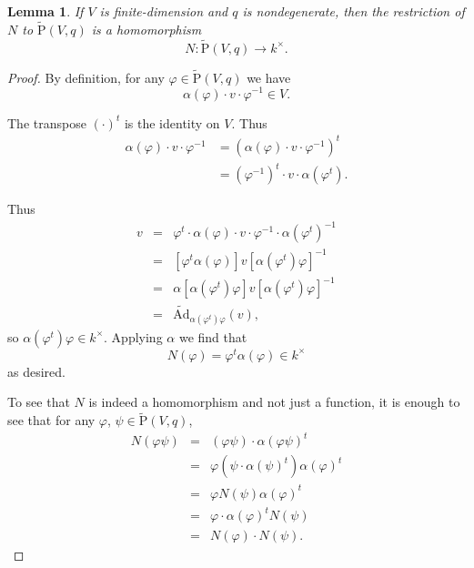 \documentclass[a4paper,10pt]{scrreprt}
\newcommand{\tAd}{\widetilde{\mathrm{Ad}}}
\newcommand{\tP}{\tilde{\mathrm{P}}}
\theoremstyle{definition}
\theoremstyle{plain}
\newtheorem{lemma}{Lemma}[section]
\theoremstyle{remark}
\begin{document}
\begin{lemma}
  If $V$ is finite-dimension and $q$ is nondegenerate, then the restriction of $N$ to $\tP(V, q)$ is a homomorphism 
  \begin{equation*}
    N\colon \tP(V, q) \to k^{\times}.
  \end{equation*}
\end{lemma}
\begin{proof}
  By definition, for any $\varphi \in \tP(V, q)$ we have 
  \begin{equation*}
    \alpha(\varphi) \cdot v \cdot \varphi^{-1} \in V.
  \end{equation*}

  The transpose $( \cdot )^{t}$ is the identity on $V$. Thus
  \begin{align*}
    \alpha(\varphi) \cdot v \cdot \varphi^{-1} &=  (\alpha(\varphi) \cdot v \cdot \varphi^{-1})^{t}  \\
    &= (\varphi^{-1})^{t} \cdot v \cdot \alpha(\varphi^{t}).
  \end{align*}

  Thus
  \begin{eqnarray*}
    v &=& \varphi^{t} \cdot \alpha(\varphi) \cdot v \cdot \varphi^{-1} \cdot \alpha(\varphi^{t})^{-1} \\
    &=& [\varphi^{t} \alpha(\varphi)]v[\alpha(\varphi^{t}) \varphi]^{-1} \\
    &=& \alpha[\alpha(\varphi^{t}) \varphi]v[\alpha(\varphi^{t})\varphi]^{-1} \\
    &=& \tAd_{\alpha(\varphi^{t}) \varphi} (v),
  \end{eqnarray*}
  so $\alpha(\varphi^{t}) \varphi \in k^{\times}$. Applying $\alpha$ we find that
  \begin{equation*}
    N(\varphi) = \varphi^{t} \alpha(\varphi) \in k^{\times}
  \end{equation*}
  as desired.

  To see that $N$ is indeed a homomorphism and not just a function, it is enough to see that for any $\varphi$, $\psi \in \tP(V, q)$,
  \begin{eqnarray*}
    N(\varphi\psi) &=& (\varphi\psi)\cdot\alpha(\varphi\psi)^{t} \\
    &=& \varphi \left( \psi \cdot \alpha(\psi)^{t} \right) \alpha(\varphi)^{t} \\
    &=& \varphi N(\psi) \alpha(\varphi)^{t} \\
    &=& \varphi \cdot \alpha(\varphi)^{t}N(\psi)  \\
    &=& N(\varphi) \cdot N(\psi).
  \end{eqnarray*}
\end{proof}
\end{document}

